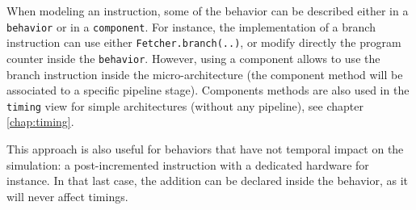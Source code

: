 When modeling an instruction, some of the behavior can be described either in a \texttt{behavior} or in a \texttt{component}. For instance, the implementation of a branch instruction can use either \texttt{Fetcher.branch(..)}, or modify directly the program counter inside the \texttt{behavior}. However, using a component allows to use the branch instruction inside the micro-architecture (the component method will be associated to a specific pipeline stage). Components methods are also used in the \texttt{timing} view for simple architectures (without any pipeline), see chapter \ref{chap:timing}.

This approach is also useful for behaviors that have not temporal impact on the simulation: a post-incremented instruction with a dedicated hardware for instance. In that last case, the addition can be declared inside the behavior, as it will never affect timings.


